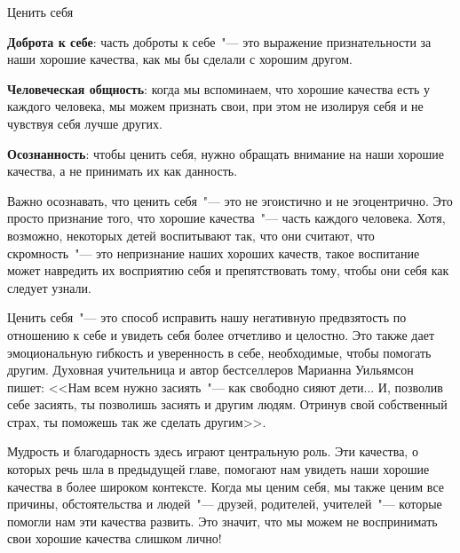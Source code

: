 \vspace{5ex}

\begin{center}
	{\Large Ценить себя}
\end{center}

\textbf{Доброта к себе}: часть доброты к себе~"--- это выражение признательности за наши хорошие качества, как мы бы сделали с хорошим другом. 

\vspace{2ex}

\textbf{Человеческая общность}: когда мы вспоминаем, что хорошие качества есть у каждого человека, мы можем признать свои, при этом не изолируя себя и не чувствуя себя лучше других. 

\vspace{2ex}

\textbf{Осознанность}: чтобы ценить себя, нужно обращать внимание на наши хорошие качества, а не принимать их как данность. 

\vspace{5ex}

Важно осознавать, что ценить себя~"--- это не эгоистично и не эгоцентрично. Это просто признание того, что хорошие качества~"--- часть каждого человека. Хотя, возможно, некоторых детей воспитывают так, что они считают, что скромность~"--- это непризнание наших хороших качеств, такое воспитание может навредить их восприятию себя и препятствовать тому, чтобы они себя как следует узнали.

Ценить себя~"--- это способ исправить нашу негативную предвзятость по отношению к себе и увидеть себя более отчетливо и целостно. Это также дает эмоциональную гибкость и уверенность в себе, необходимые, чтобы помогать другим. Духовная учительница и автор бестселлеров Марианна Уильямсон пишет: <<Нам всем нужно засиять~"--- как свободно сияют дети... И, позволив себе засиять, ты позволишь засиять и другим людям. Отринув свой собственный страх, ты поможешь так же сделать другим>>.

Мудрость и благодарность здесь играют центральную роль. Эти качества, о которых речь шла в предыдущей главе, помогают нам увидеть наши хорошие качества в более широком контексте. Когда мы ценим себя, мы также ценим все причины, обстоятельства и людей~"--- друзей, родителей, учителей~"--- которые помогли нам эти качества развить. Это значит, что мы можем не воспринимать свои хорошие качества слишком лично! 


